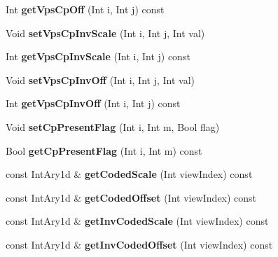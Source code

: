 \begin{DoxyCompactItemize}
\mbox{\label{class_t_com_v_p_s_ab777bce6552682e953db8343ca5b8f0b}} 
Int {\bfseries get\+Vps\+Cp\+Off} (Int i, Int j) const
\item 
\mbox{\label{class_t_com_v_p_s_a4f2fe21bcf3e2edd65c07f3d1eb6826a}} 
Void {\bfseries set\+Vps\+Cp\+Inv\+Scale} (Int i, Int j, Int val)
\item 
\mbox{\label{class_t_com_v_p_s_a6071c2491e8939efd420da0543c20ca0}} 
Int {\bfseries get\+Vps\+Cp\+Inv\+Scale} (Int i, Int j) const
\item 
\mbox{\label{class_t_com_v_p_s_a467a4c54ebd1fefe7caa39f268a06d6a}} 
Void {\bfseries set\+Vps\+Cp\+Inv\+Off} (Int i, Int j, Int val)
\item 
\mbox{\label{class_t_com_v_p_s_ae30183b7a614688cf8a5bdbe878b2e48}} 
Int {\bfseries get\+Vps\+Cp\+Inv\+Off} (Int i, Int j) const
\item 
\mbox{\label{class_t_com_v_p_s_ad530da74416520fee31c1a5e2ed394d7}} 
Void {\bfseries set\+Cp\+Present\+Flag} (Int i, Int m, Bool flag)
\item 
\mbox{\label{class_t_com_v_p_s_a7f92e8bac5cc1699c7e7c75c1ad38a59}} 
Bool {\bfseries get\+Cp\+Present\+Flag} (Int i, Int m) const
\item 
\mbox{\label{class_t_com_v_p_s_a003a6f99d3a79e22e4ea2ad6baefb162}} 
const Int\+Ary1d \& {\bfseries get\+Coded\+Scale} (Int view\+Index) const
\item 
\mbox{\label{class_t_com_v_p_s_a59db2e70496bf9598f8600720385f68b}} 
const Int\+Ary1d \& {\bfseries get\+Coded\+Offset} (Int view\+Index) const
\item 
\mbox{\label{class_t_com_v_p_s_a90aee458903aa320bf4f50493c0339d8}} 
const Int\+Ary1d \& {\bfseries get\+Inv\+Coded\+Scale} (Int view\+Index) const
\item 
\mbox{\label{class_t_com_v_p_s_a1d6c55ac410bb2511d170d19614756c7}} 
const Int\+Ary1d \& {\bfseries get\+Inv\+Coded\+Offset} (Int view\+Index) const

\end{DoxyCompactItemize}
